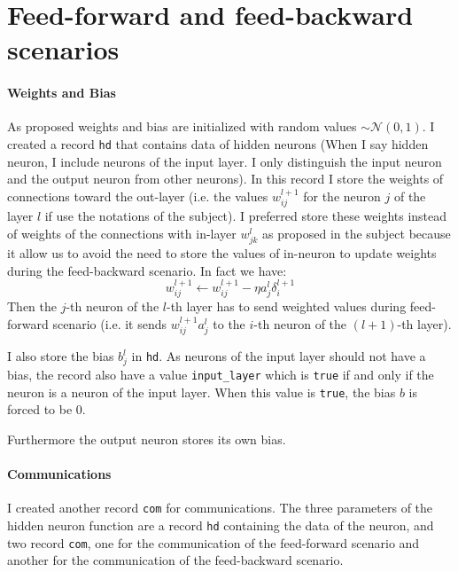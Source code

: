\documentclass[12pt]{article}
\begin{document}
\section{Feed-forward and feed-backward scenarios}

\paragraph{Weights and Bias}
As proposed weights and bias are initialized with random values $\sim \mathcal{N}(0, 1)$. I created a record \verb|hd| that contains data of hidden neurons (When I say hidden neuron, I include neurons of the input layer. I only distinguish the input neuron and the output neuron from other neurons). In this record I store the weights of connections toward the out-layer (i.e. the values $w_{ij}^{l+1}$ for the neuron $j$ of the layer $l$ if use the notations of the subject). I preferred store these weights instead of weights of the connections with in-layer $w_{jk}^l$ as proposed in the subject because it allow us to avoid the need to store the values of in-neuron to update weights during the feed-backward scenario. In fact we have:
$$ w_{ij}^{l+1} \gets w_{ij}^{l+1} - \eta a_j^l \delta_i^{l+1} $$
Then the $j$-th neuron of the $l$-th layer has to send weighted values during feed-forward scenario (i.e. it sends $w_{ij}^{l+1} a_j^l$ to the $i$-th neuron of the $(l+1)$-th layer).

I also store the bias $b_j^l$ in \verb|hd|. As neurons of the input layer should not have a bias, the record also have a value \verb|input_layer| which is \verb|true| if and only if the neuron is a neuron of the input layer. When this value is \verb|true|, the bias $b$ is forced to be 0.

Furthermore the output neuron stores its own bias.

\paragraph{Communications}
I created another record \verb|com| for communications. The three parameters of the hidden neuron function are a record \verb|hd| containing the data of the neuron, and two record \verb|com|, one for the communication of the feed-forward scenario and another for the communication of the feed-backward scenario.
\end{document}
